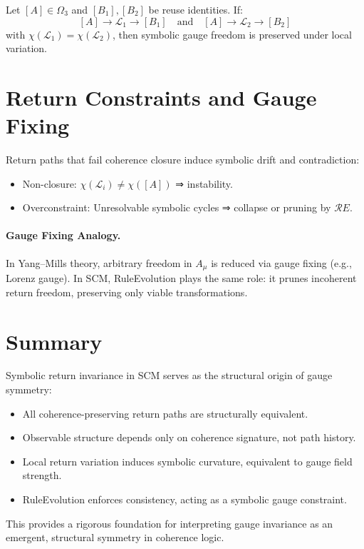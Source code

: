 \begin{definition}
Let \( [A] \in \Omega_3 \) and \( [B_1], [B_2] \) be reuse identities. If:
\[
[A] \to \mathcal{L}_1 \to [B_1] \quad \text{and} \quad [A] \to \mathcal{L}_2 \to [B_2]
\]
with \( \chi(\mathcal{L}_1) = \chi(\mathcal{L}_2) \), then symbolic gauge freedom is preserved under local variation.

\end{definition}

\section{Return Constraints and Gauge Fixing}

Return paths that fail coherence closure induce symbolic drift and contradiction:

\begin{itemize}
  \item Non-closure: \( \chi(\mathcal{L}_i) \ne \chi([A]) \) ⇒ instability.
  \item Overconstraint: Unresolvable symbolic cycles ⇒ collapse or pruning by \( \mathcal{R}E \).
\end{itemize}

\paragraph{Gauge Fixing Analogy.}
In Yang--Mills theory, arbitrary freedom in \( A_\mu \) is reduced via gauge fixing (e.g., Lorenz gauge). In SCM, RuleEvolution plays the same role: it prunes incoherent return freedom, preserving only viable transformations.

\section{Summary}

Symbolic return invariance in SCM serves as the structural origin of gauge symmetry:

\begin{itemize}
  \item All coherence-preserving return paths are structurally equivalent.
  \item Observable structure depends only on coherence signature, not path history.
  \item Local return variation induces symbolic curvature, equivalent to gauge field strength.
  \item RuleEvolution enforces consistency, acting as a symbolic gauge constraint.
\end{itemize}

This provides a rigorous foundation for interpreting gauge invariance as an emergent, structural symmetry in coherence logic.
